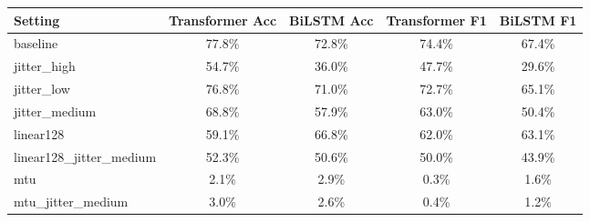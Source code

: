 \begin{tabular}{lcccc}
\toprule
Setting & Transformer Acc & BiLSTM Acc & Transformer F1 & BiLSTM F1 \\
\midrule
baseline & 77.8\% & 72.8\% & 74.4\% & 67.4\% \\
jitter_high & 54.7\% & 36.0\% & 47.7\% & 29.6\% \\
jitter_low & 76.8\% & 71.0\% & 72.7\% & 65.1\% \\
jitter_medium & 68.8\% & 57.9\% & 63.0\% & 50.4\% \\
linear128 & 59.1\% & 66.8\% & 62.0\% & 63.1\% \\
linear128_jitter_medium & 52.3\% & 50.6\% & 50.0\% & 43.9\% \\
mtu & 2.1\% & 2.9\% & 0.3\% & 1.6\% \\
mtu_jitter_medium & 3.0\% & 2.6\% & 0.4\% & 1.2\% \\
\bottomrule
\end{tabular}
